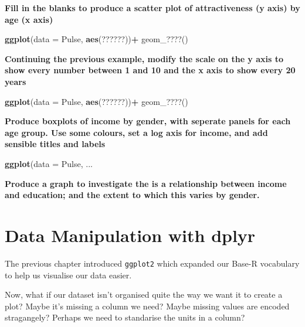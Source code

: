 \documentclass[]{book}
\newenvironment{Shaded}{\begin{snugshade}}{\end{snugshade}}
\newcommand{\DataTypeTok}[1]{\textcolor[rgb]{0.13,0.29,0.53}{#1}}
\newcommand{\KeywordTok}[1]{\textcolor[rgb]{0.13,0.29,0.53}{\textbf{#1}}}
\newcommand{\NormalTok}[1]{#1}
\newcommand{\OperatorTok}[1]{\textcolor[rgb]{0.81,0.36,0.00}{\textbf{#1}}}
\newcommand{\StringTok}[1]{\textcolor[rgb]{0.31,0.60,0.02}{#1}}
\begin{document}
\textbf{Fill in the blanks to produce a scatter plot of attractiveness (y axis) by age (x axis)}

\begin{Shaded}
\begin{Highlighting}[]
\KeywordTok{ggplot}\NormalTok{(}\DataTypeTok{data =}\NormalTok{ Pulse,  }\KeywordTok{aes}\NormalTok{(??????))}\OperatorTok{+}
\StringTok{  }\NormalTok{geom_????()}
\end{Highlighting}
\end{Shaded}

\textbf{Continuing the previous example, modify the scale on the y axis to show every number between 1 and 10 and the x axis to show every 20 years}

\begin{Shaded}
\begin{Highlighting}[]
\KeywordTok{ggplot}\NormalTok{(}\DataTypeTok{data =}\NormalTok{ Pulse,  }\KeywordTok{aes}\NormalTok{(??????))}\OperatorTok{+}
\StringTok{  }\NormalTok{geom_????()}
\end{Highlighting}
\end{Shaded}

\textbf{Produce boxplots of income by gender, with seperate panels for each age group. Use some colours, set a log axis for income, and add sensible titles and labels }

\begin{Shaded}
\begin{Highlighting}[]
\KeywordTok{ggplot}\NormalTok{(}\DataTypeTok{data =}\NormalTok{ Pulse, ...}
\end{Highlighting}
\end{Shaded}

\textbf{Produce a graph to investigate the is a relationship between income and education; and the extent to which this varies by gender.}

\hypertarget{data-manipulation-with-dplyr}{%
\chapter{Data Manipulation with dplyr}\label{data-manipulation-with-dplyr}}

The previous chapter introduced \texttt{ggplot2} which expanded our Base-R vocabulary to help us visualise our data easier.

Now, what if our dataset isn't organised quite the way we want it to create a plot? Maybe it's missing a column we need? Maybe missing values are encoded stragangely? Perhaps we need to standarise the units in a column?
\end{document}
